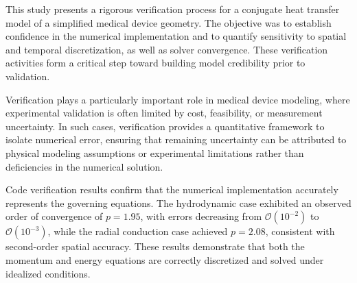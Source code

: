 

This study presents a rigorous verification process for a conjugate heat transfer model of a simplified medical device geometry. The objective was to establish confidence in the numerical implementation and to quantify sensitivity to spatial and temporal discretization, as well as solver convergence. These verification activities form a critical step toward building model credibility prior to validation.

Verification plays a particularly important role in medical device modeling, where experimental validation is often limited by cost, feasibility, or measurement uncertainty. In such cases, verification provides a quantitative framework to isolate numerical error, ensuring that remaining uncertainty can be attributed to physical modeling assumptions or experimental limitations rather than deficiencies in the numerical solution.

Code verification results confirm that the numerical implementation accurately represents the governing equations. The hydrodynamic case exhibited an observed order of convergence of $p = 1.95$, with errors decreasing from $\mathcal{O}(10^{-2})$ to $\mathcal{O}(10^{-3})$, while the radial conduction case achieved $p = 2.08$, consistent with second-order spatial accuracy. These results demonstrate that both the momentum and energy equations are correctly discretized and solved under idealized conditions.


